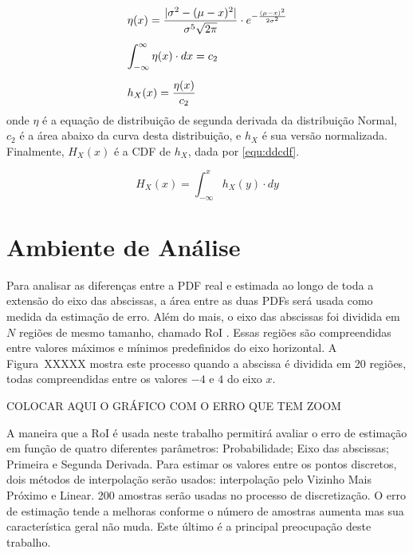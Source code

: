\begin{equation}
\begin{array}{l}
\vspace{0.3cm}\displaystyle \eta(x) = \frac{|\sigma^2 - (\mu - x)^2|}{ \sigma^5\sqrt{2\pi}}\cdot e^{-\frac{(\mu - x)^2}{2 \sigma^2}} \\
\vspace{0.3cm} \displaystyle \int_{-\infty}^{\infty} \eta(x)\cdot dx = c_2 \\
\displaystyle h_X(x) = \frac{\eta(x)}{c_2}
\label{equ:hx}
\end{array}
\end{equation}
onde $\eta$ é a equação de distribuição de segunda derivada da distribuição Normal, $c_2$ é a área abaixo da curva desta distribuição, e $h_X$ é sua versão normalizada. 
Finalmente, $H_X(x)$ é a \ac{CDF} de $h_X$, dada por \eqref{equ:ddcdf}.

\begin{equation}
H_X(x) = \int_{-\infty}^x h_X(y)\cdot dy
\label{equ:ddcdf}
\end{equation}


\section{Ambiente de Análise}
Para analisar as diferenças entre a \ac{PDF} real e estimada ao longo de toda a extensão do eixo das abscissas, a área entre as duas \ac{PDF}s será usada como medida da estimação de erro. Além do mais, o eixo das abscissas foi dividida em $N$ regiões de mesmo tamanho, chamado \ac{RoI} \cite{ron1999art}. Essas regiões são compreendidas entre valores máximos e mínimos predefinidos do eixo horizontal. A Figura~XXXXX mostra este processo quando a abscissa é dividida em 20 regiões, todas compreendidas entre os valores $-4$ e $4$ do eixo $ x $.


{\color{red} COLOCAR AQUI O GRÁFICO COM O ERRO QUE TEM ZOOM}

A maneira que a \ac{RoI} é usada neste trabalho permitirá avaliar o erro de estimação em função de quatro diferentes parâmetros: Probabilidade; Eixo das abscissas; Primeira e Segunda Derivada. Para estimar os valores entre os pontos discretos, dois métodos de interpolação serão usados: interpolação pelo Vizinho Mais Próximo e Linear. 200 amostras serão usadas no processo de discretização. O erro de estimação tende a melhoras conforme o número de amostras aumenta mas sua característica geral não muda. Este último é a principal preocupação deste trabalho.

